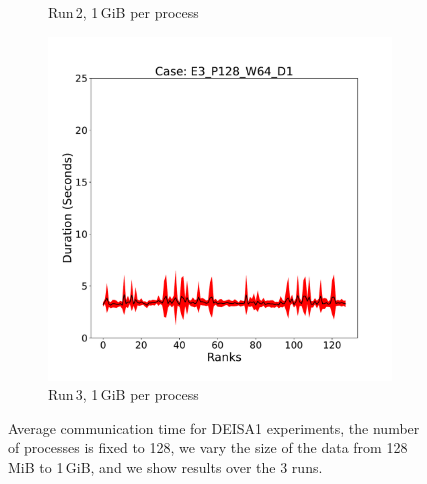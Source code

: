\begin{figure}
\begin{subfigure}[b]{0.3\textwidth}
         \caption{Run\,2, 1\,GiB per process}
         \label{fig:E2_1_d11}
     \end{subfigure}
      \hfill
     \begin{subfigure}[b]{0.3\textwidth}
         \centering
         \includegraphics[width=\textwidth, height=\textwidth]{figures/deisa1__E3_P128_W64_D1.pdf}
         \caption{Run\,3, 1\,GiB per process}
         \label{fig:E3_1_d11}
     \end{subfigure}
        \caption{Average communication time for DEISA1 experiments, the number of processes is fixed to 128, we vary the size of the data from 128\,MiB to 1\,GiB, and we show results over the 3 runs.}
        \label{fig:variability11}
\end{figure}



